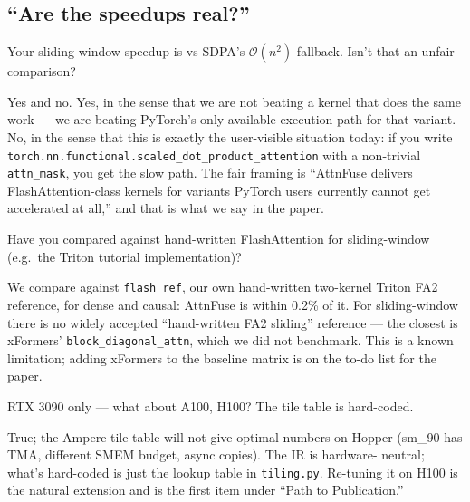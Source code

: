 \documentclass[11pt]{article}
\begin{document}
\subsection{``Are the speedups real?''}

\begin{question}{Your sliding-window speedup is vs SDPA's $\mathcal{O}(n^2)$
fallback. Isn't that an unfair comparison?}
\end{question}
\begin{answer}
Yes and no. Yes, in the sense that we are not beating a kernel that does the
same work --- we are beating PyTorch's only available execution path for
that variant. No, in the sense that this is exactly the user-visible
situation today: if you write \texttt{torch.nn.functional.scaled\_dot\_product\_attention}
with a non-trivial \texttt{attn\_mask}, you get the slow path. The fair
framing is ``AttnFuse delivers FlashAttention-class kernels for variants
PyTorch users currently cannot get accelerated at all,'' and that is what
we say in the paper.
\end{answer}

\begin{question}{Have you compared against hand-written FlashAttention for
sliding-window (e.g.~the Triton tutorial implementation)?}
\end{question}
\begin{answer}
We compare against \texttt{flash\_ref}, our own hand-written two-kernel
Triton FA2 reference, for dense and causal: AttnFuse is within 0.2\% of it.
For sliding-window there is no widely accepted ``hand-written FA2 sliding''
reference --- the closest is xFormers' \texttt{block\_diagonal\_attn}, which
we did not benchmark. This is a known limitation; adding xFormers to the
baseline matrix is on the to-do list for the paper.
\end{answer}

\begin{question}{RTX 3090 only --- what about A100, H100? The tile table is
hard-coded.}
\end{question}
\begin{answer}
True; the Ampere tile table will not give optimal numbers on Hopper
(sm\_90 has TMA, different SMEM budget, async copies). The IR is hardware-
neutral; what's hard-coded is just the lookup table in
\texttt{tiling.py}. Re-tuning it on H100 is the natural extension and is the
first item under ``Path to Publication.''
\end{answer}
\end{document}
